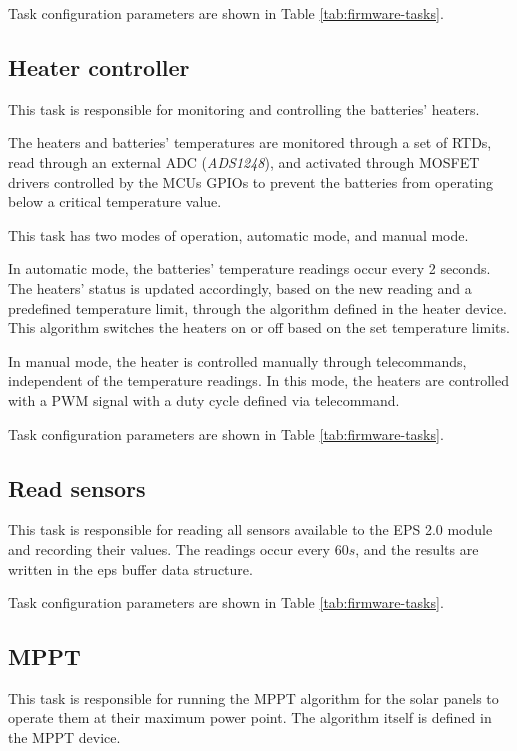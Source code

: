 Task configuration parameters are shown in Table \ref{tab:firmware-tasks}.

\subsection{Heater controller}

This task is responsible for monitoring and controlling the batteries' heaters.

The heaters and batteries' temperatures are monitored through a set of RTDs, read through an external ADC (\textit{ADS1248}), and activated through MOSFET drivers controlled by the MCUs GPIOs to prevent the batteries from operating below a critical temperature value.

This task has two modes of operation, automatic mode, and manual mode.

In automatic mode, the batteries' temperature readings occur every 2 seconds. The heaters' status is updated accordingly, based on the new reading and a predefined temperature limit, through the algorithm defined in the heater device.
This algorithm switches the heaters on or off based on the set temperature limits.

In manual mode, the heater is controlled manually through telecommands, independent of the temperature readings. In this mode, the heaters are controlled with a PWM signal with a duty cycle defined via telecommand.

Task configuration parameters are shown in Table \ref{tab:firmware-tasks}.

\subsection{Read sensors}

This task is responsible for reading all sensors available to the EPS 2.0 module and recording their values.
The readings occur every \(60 s\), and the results are written in the eps buffer data structure.

Task configuration parameters are shown in Table \ref{tab:firmware-tasks}.

\subsection{MPPT}

This task is responsible for running the MPPT algorithm for the solar panels to operate them at their maximum power point.
The algorithm itself is defined in the MPPT device.

